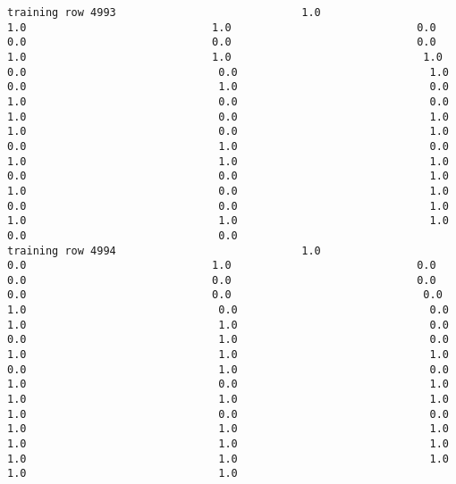 \documentclass[11pt]{article}
\begin{document}
\begin{verbatim}
training row 4993                             1.0                             1.0                             1.0                             0.0                             0.0                             0.0                             0.0                             1.0                             1.0                              1.0                              0.0                              0.0                              1.0                              0.0                              1.0                              0.0                              1.0                              0.0                              0.0                              1.0                              0.0                              1.0                              1.0                              0.0                              1.0                              0.0                              1.0                              0.0                              1.0                              1.0                              1.0                              0.0                              0.0                              1.0                              1.0                              0.0                              1.0                              0.0                              0.0                              1.0                              1.0                              1.0                              1.0                              0.0                              0.0
training row 4994                             1.0                             0.0                             1.0                             0.0                             0.0                             0.0                             0.0                             0.0                             0.0                              0.0                              1.0                              0.0                              0.0                              1.0                              1.0                              0.0                              0.0                              1.0                              0.0                              1.0                              1.0                              1.0                              0.0                              1.0                              0.0                              1.0                              0.0                              1.0                              1.0                              1.0                              1.0                              1.0                              0.0                              0.0                              1.0                              1.0                              1.0                              1.0                              1.0                              1.0                              1.0                              1.0                              1.0                              1.0                              1.0

\end{verbatim}
\end{document}
